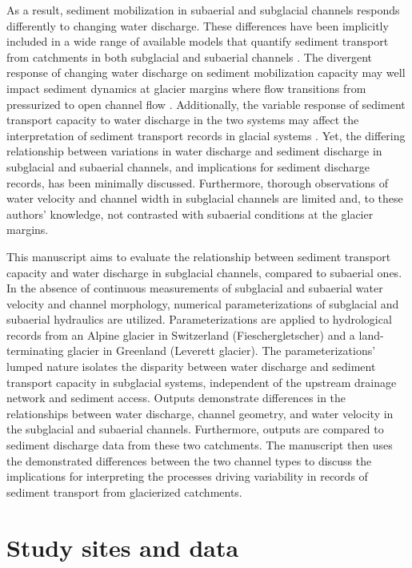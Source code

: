 \documentclass[11pt]{article}
\newcommand{\mauro}[1]{{\textbf{\color{green}Mauro says:} \color{green} #1} }
\begin{document}
As a result, sediment mobilization in subaerial and subglacial channels responds differently to changing water discharge.
These differences have been implicitly included in a wide range of available models that  quantify sediment transport from catchments in both subglacial and subaerial channels  \citep[e.g.][]{walder1994,tucker1997,creyts2013,wickert2019,hewitt2019}.
The divergent response of changing water discharge on sediment mobilization capacity may well impact sediment dynamics at glacier margins where flow transitions from pressurized to open channel flow \citep[e.g.][]{lane2016,perolo2018}.
Additionally, the variable response of sediment transport capacity to water discharge in the two systems may affect the interpretation of sediment transport records in glacial systems \citep[e.g.][]{muller1968,richards2003,swift2005,ganti2016}.
Yet, the differing relationship between variations in water discharge and sediment discharge in subglacial and subaerial channels, and implications for sediment discharge records, has been minimally discussed.
Furthermore, thorough observations of water velocity and channel width in subglacial channels are limited and, to these authors' knowledge, not contrasted with subaerial conditions at the glacier margins. %

This manuscript aims to evaluate the relationship between sediment transport capacity and water discharge in subglacial channels, compared to subaerial ones.
In the absence of continuous measurements of subglacial and subaerial water velocity and channel morphology, numerical parameterizations of subglacial and subaerial hydraulics are utilized.
Parameterizations are applied to hydrological records from an Alpine glacier in Switzerland (Fieschergletscher) and  a land-terminating glacier in Greenland (Leverett glacier).
The parameterizations' lumped nature isolates the disparity between water discharge and sediment transport capacity in subglacial systems, independent of the upstream drainage network and sediment access.
Outputs demonstrate differences in the relationships between  water discharge, channel geometry, and water velocity in the subglacial and subaerial channels.
Furthermore, outputs are compared to sediment discharge data from these two catchments.
The manuscript then uses the demonstrated differences between the two channel types to discuss the implications for interpreting the processes driving variability in records of sediment transport from glacierized catchments.

\section{Study sites and data}
\label{sect:ss_data}
\end{document}

